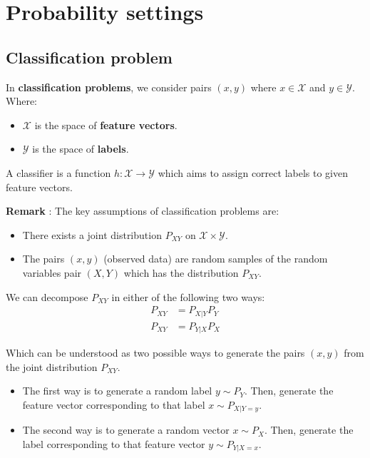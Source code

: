 \newpage 
\section{Probability settings}

\subsection{Classification problem}
\begin{definition}[Classifier ($h$)]
    In \textbf{classification problems}, we consider pairs $(x, y)$
    where $x\in \mathcal{X}$ and $y\in\mathcal{Y}$. Where:
    \begin{itemize}
        \item $\mathcal{X}$ is the space of \textbf{feature vectors}.
        \item $\mathcal{Y}$ is the space of \textbf{labels}.
    \end{itemize}

    \noindent A classifier is a function $h:\mathcal{X} \to \mathcal{Y}$ which aims
    to assign correct labels to given feature vectors. 
\end{definition}

\textbf{Remark} : The key assumptions of classification problems are:
\begin{itemize}
    \item There exists a joint distribution $P_{XY}$ on $\mathcal{X}\times\mathcal{Y}$.
    \item The pairs $(x, y)$ (observed data) are random samples of the random variables pair
    $(X, Y)$ which has the distribution $P_{XY}$.
\end{itemize}

\begin{definition}[Decomposition of $P_{XY}$]
    We can decompose $P_{XY}$ in either of the following two ways:
    \begin{align*}
        P_{XY} &= P_{X|Y} P_Y \\
        P_{XY} &= P_{Y|X} P_X
    \end{align*}

    \noindent Which can be understood as two possible ways to generate the pairs $(x, y)$ from
    the joint distribution $P_{XY}$.
    \begin{itemize}
        \item The first way is to generate a random label $y\sim P_Y$. Then, generate the feature
        vector corresponding to that label $x \sim P_{X|Y=y}$.
        \item The second way is to generate a random vector $x\sim P_X$. Then, generate the label 
        corresponding to that feature vector $y \sim P_{Y|X=x}$.
    \end{itemize}
\end{definition}


